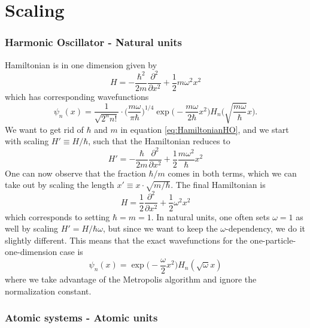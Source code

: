 \chapter{Scaling}

\subsection{Harmonic Oscillator - Natural units}
Hamiltonian is in one dimension given by
\begin{equation}
H=-\frac{\hbar^2}{2m}\frac{\partial^2}{\partial x^2}+\frac{1}{2}m\omega^2x^2
\label{eq:HamiltonianHO}
\end{equation}
which has corresponding wavefunctions
\begin{equation}
\psi_n(x)=\frac{1}{\sqrt{2^nn!}}\cdot\bigg(\frac{m\omega}{\pi\hbar}\bigg)^{1/4}\exp\Big(-\frac{m\omega}{2\hbar}x^2\Big)H_n\Big(\sqrt{\frac{m\omega}{\hbar}}x\Big).
\end{equation}
We want to get rid of $\hbar$ and $m$ in equation \eqref{eq:HamiltonianHO}, and we start with scaling $H'\equiv H/\hbar$, such that the Hamiltonian reduces to
\begin{equation}
H'=-\frac{\hbar}{2m}\frac{\partial^2}{\partial x^2}+\frac{1}{2}\frac{m\omega^2}{\hbar}x^2
\end{equation}
One can now observe that the fraction $\hbar/m$ comes in both terms, which we can take out by scaling the length $x'\equiv x\cdot\sqrt{m/\hbar}$. The final Hamiltonian is
\begin{equation}
H=\frac{1}{2}\frac{\partial^2}{\partial x^2}+\frac{1}{2}\omega^2x^2
\end{equation}
which corresponds to setting $\hbar=m=1$. In natural units, one often sets $\omega=1$ as well by scaling $H'=H/\hbar\omega$, but since we want to keep the $\omega$-dependency, we do it slightly different. This means that the exact wavefunctions for the one-particle-one-dimension case is
\begin{equation}
\psi_n(x)=\exp\Big(-\frac{\omega}{2}x^2\Big)H_n(\sqrt{\omega}x)
\end{equation}
where we take advantage of the Metropolis algorithm and ignore the normalization constant. 

\subsection{Atomic systems - Atomic units}
